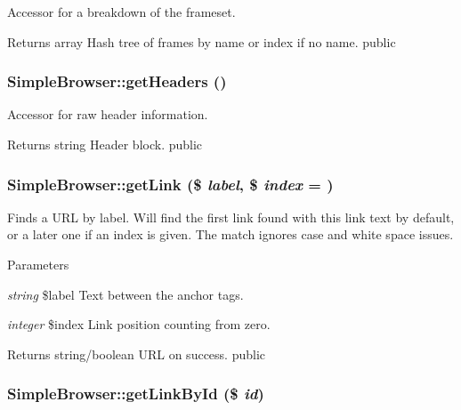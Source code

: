 \label{class_simple_browser_a07cc18881732a8c404493deb9fdcbb51}
Accessor for a breakdown of the frameset. \begin{DoxyReturn}{Returns}
array Hash tree of frames by name or index if no name.  public 
\end{DoxyReturn}
\hypertarget{class_simple_browser_a0bfe8a9c6e52312c54afee681e6871f2}{
\subsubsection[{getHeaders}]{\setlength{\rightskip}{0pt plus 5cm}SimpleBrowser::getHeaders ()}}
\label{class_simple_browser_a0bfe8a9c6e52312c54afee681e6871f2}
Accessor for raw header information. \begin{DoxyReturn}{Returns}
string Header block.  public 
\end{DoxyReturn}
\hypertarget{class_simple_browser_aa470970ab516973d824e0cc2486f615f}{
\subsubsection[{getLink}]{\setlength{\rightskip}{0pt plus 5cm}SimpleBrowser::getLink (\$ {\em label}, \/  \$ {\em index} = {})}}
\label{class_simple_browser_aa470970ab516973d824e0cc2486f615f}
Finds a URL by label. Will find the first link found with this link text by default, or a later one if an index is given. The match ignores case and white space issues. 
\begin{DoxyParams}{Parameters}
\item[{\em string}]\$label Text between the anchor tags. \item[{\em integer}]\$index Link position counting from zero. \end{DoxyParams}
\begin{DoxyReturn}{Returns}
string/boolean URL on success.  public 
\end{DoxyReturn}
\hypertarget{class_simple_browser_a1992ecd8ed0630eab26076c6e501910a}{
\subsubsection[{getLinkById}]{\setlength{\rightskip}{0pt plus 5cm}SimpleBrowser::getLinkById (\$ {\em id})}}
